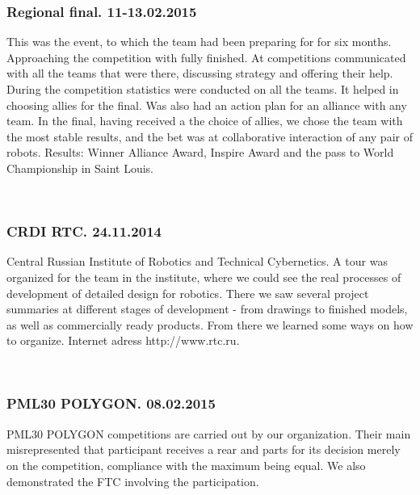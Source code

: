 	\subsubsection{Regional final. 11-13.02.2015}	
	This was the event, to which the team had been preparing for for six months. Approaching the competition with fully finished. At competitions communicated with all the teams that were there, discussing strategy and offering their help. During the competition statistics were conducted on all the teams. It helped in choosing allies for the final. Was also had an action plan for an alliance with any team. In the final, having received a the choice of allies, we chose the team with the most stable results, and the bet was at collaborative interaction of any pair of robots. Results: Winner Alliance Award, Inspire Award and the pass to World Championship in Saint Louis.
	\begin{figure}[H]
		\\
	\end{figure}
	\newpage			
	\subsubsection{CRDI RTC. 24.11.2014}
	Central Russian Institute of Robotics and Technical Cybernetics. A tour was organized for the team in the institute, where we could see the real processes of development of detailed design for robotics. There we saw several project summaries at different stages of development - from drawings to finished models, as well as commercially ready products. From there we learned some ways on how to organize. Internet adress http://www.rtc.ru.
	\begin{figure}[H]	
		\\
	\end{figure}
	\subsubsection{PML30 POLYGON. 08.02.2015}	
	PML30 POLYGON competitions are carried out by our organization. Their main  misrepresented that participant receives a rear and parts for its decision merely on the competition, compliance with the maximum being equal. We also demonstrated the FTC involving the participation.
	\begin{figure}[H]
		\\
    \end{figure}
